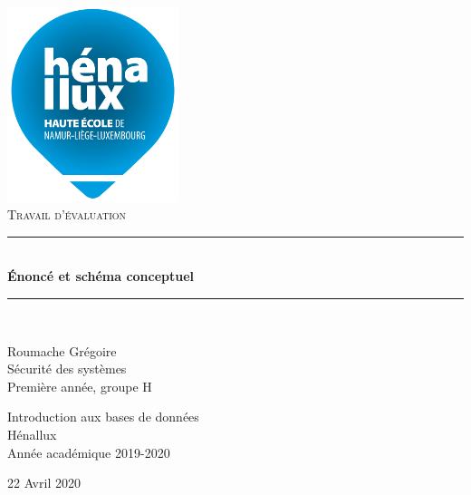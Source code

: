 \documentclass[a4paper]{article}
\newcommand{\HRule}{\rule{\linewidth}{0.5mm}}
\newcommand{\bgimg}[1]{
\AddToShipoutPicture
    {
        \put(\LenToUnit{0 cm},\LenToUnit{0 cm})
        {
            \texttt{[image: \#1]}
        }
    }
}
\begin{document}

















\begin{titlepage}
    \begin{sffamily}
        \begin{center}

            \includegraphics[width=5cm]{images/LogoHenallux.PNG}~\\[1.5cm]
            \textsc{\Large Travail d'évaluation}\\[1.5cm]

            \HRule \\[0.4cm]
            { \huge \bfseries Énoncé et schéma conceptuel\\[0.4cm] }
            \HRule \\[2cm]

            \begin{minipage}{0.4\textwidth}
                \begin{flushleft} \large
                    Roumache Grégoire\\
                    Sécurité des systèmes\\
                    Première année, groupe H \\
                \end{flushleft}
            \end{minipage}
            \begin{minipage}{0.55\textwidth}
            \begin{flushright} \large
                Introduction aux bases de données\\
                Hénallux\\
                Année académique 2019-2020\\
            \end{flushright}
            \end{minipage}
            \vfill

            {\large 22 Avril 2020}
        \end{center}
    \end{sffamily}
\end{titlepage}
\end{document}

